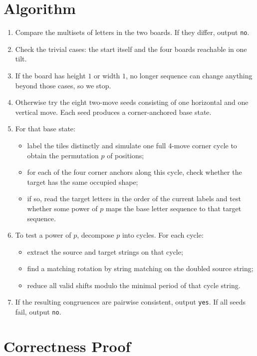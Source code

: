 \documentclass[11pt]{article}
\begin{document}
\section*{Algorithm}

\begin{enumerate}[leftmargin=*]
    \item Compare the multisets of letters in the two boards. If they differ, output \texttt{no}.
    \item Check the trivial cases: the start itself and the four boards reachable in one tilt.
    \item If the board has height $1$ or width $1$, no longer sequence can change anything beyond those
    cases, so we stop.
    \item Otherwise try the eight two-move seeds consisting of one horizontal and one vertical move. Each
    seed produces a corner-anchored base state.
    \item For that base state:
    \begin{itemize}[leftmargin=*]
        \item label the tiles distinctly and simulate one full 4-move corner cycle to obtain the permutation
        $p$ of positions;
        \item for each of the four corner anchors along this cycle, check whether the target has the same
        occupied shape;
        \item if so, read the target letters in the order of the current labels and test whether some power of
        $p$ maps the base letter sequence to that target sequence.
    \end{itemize}
    \item To test a power of $p$, decompose $p$ into cycles. For each cycle:
    \begin{itemize}[leftmargin=*]
        \item extract the source and target strings on that cycle;
        \item find a matching rotation by string matching on the doubled source string;
        \item reduce all valid shifts modulo the minimal period of that cycle string.
    \end{itemize}
    \item If the resulting congruences are pairwise consistent, output \texttt{yes}. If all seeds fail, output
    \texttt{no}.
\end{enumerate}

\section*{Correctness Proof}
\end{document}
